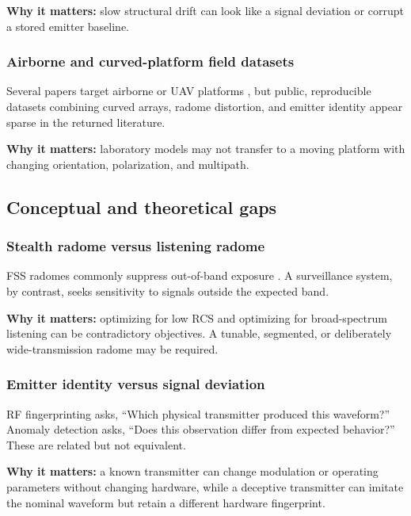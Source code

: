 \documentclass[
  10pt,
]{article}
\begin{document}
\textbf{Why it matters:} slow structural drift can look like a signal
deviation or corrupt a stored emitter baseline.

\subsubsection{Airborne and curved-platform field
datasets}\label{airborne-and-curved-platform-field-datasets}

Several papers target airborne or UAV platforms
\citep{gupta2023, pi2025, sorecau2026}, but public, reproducible
datasets combining curved arrays, radome distortion, and emitter
identity appear sparse in the returned literature.

\textbf{Why it matters:} laboratory models may not transfer to a moving
platform with changing orientation, polarization, and multipath.

\subsection{Conceptual and theoretical
gaps}\label{conceptual-and-theoretical-gaps}

\subsubsection{Stealth radome versus listening
radome}\label{stealth-radome-versus-listening-radome}

FSS radomes commonly suppress out-of-band exposure
\citep{costa2012, lv2021, xing2022}. A surveillance system, by contrast,
seeks sensitivity to signals outside the expected band.

\textbf{Why it matters:} optimizing for low RCS and optimizing for
broad-spectrum listening can be contradictory objectives. A tunable,
segmented, or deliberately wide-transmission radome may be required.

\subsubsection{Emitter identity versus signal
deviation}\label{emitter-identity-versus-signal-deviation}

RF fingerprinting asks, ``Which physical transmitter produced this
waveform?'' Anomaly detection asks, ``Does this observation differ from
expected behavior?'' These are related but not equivalent.

\textbf{Why it matters:} a known transmitter can change modulation or
operating parameters without changing hardware, while a deceptive
transmitter can imitate the nominal waveform but retain a different
hardware fingerprint.
\end{document}
